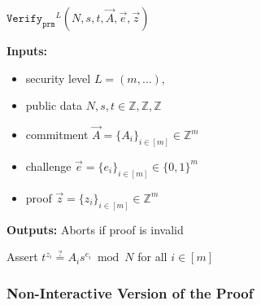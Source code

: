 \documentclass[11pt]{article}
\newenvironment{inlineAlgorithm}{}{}
\newcommand{\algoName}[1]{#1 \par}
\newcommand{\algoInputsList}[1]{
    {\small \bf Inputs:} 
        \begin{itemize}[noitemsep,topsep=0pt]
            #1
        \end{itemize}
}
\newcommand{\algoOutputs}[1]{
    {\small \bf Outputs:} #1 \par
}
\newcommand{\verify}[1]{\ensuremath{\mathtt{Verify}_{\mathtt{#1}}}}
\newcommand{\Z}{\mathbb{Z}}
\newcommand{\?}[1]{\stackrel{?}{#1}}
\newcommand{\Bit}{\ensuremath{\{0{,}1\}}}
\begin{document}
\begin{description}
\item
\begin{inlineAlgorithm}
\algoName{$\verify{prm}^L(N, s, t, \vec A, \vec e, \vec z)$}
\algoInputsList{
    \item security level $L = (m, \dots)$,
    \item public data $N, s, t \in \Z, \Z, \Z$
    \item commitment $\vec A = \{A_i\}_{i\in[m]} \in \Z^m$
    \item challenge $\vec e = \{e_i\}_{i\in[m]} \in \Bit^m$
    \item proof $\vec z = \{z_i\}_{i\in[m]} \in \Z^m$
}
\algoOutputs{Aborts if proof is invalid}
\begin{algorithmic}[1]
\State Assert $t^{z_i} \? = A_i s^{e_i} \bmod N$ for all $i \in [m]$
\end{algorithmic}
\end{inlineAlgorithm}

\end{description}


\subsubsection{Non-Interactive Version of the Proof}
\end{document}
